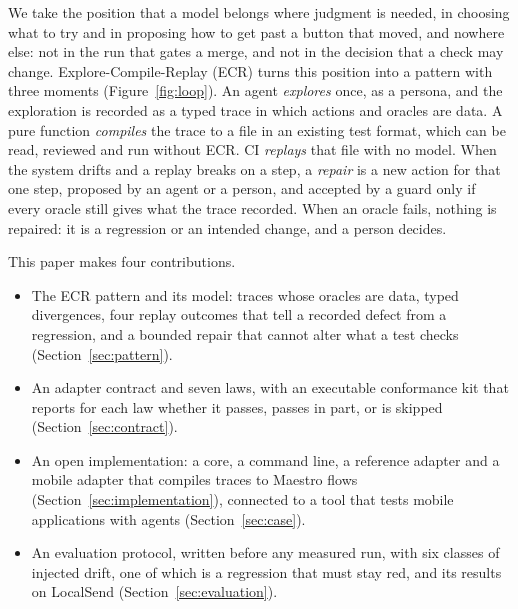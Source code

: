 We take the position that a model belongs where judgment is needed, in choosing what to try and in proposing how to get past a button that moved, and nowhere else: not in the run that gates a merge, and not in the decision that a check may change. Explore-Compile-Replay (ECR) turns this position into a pattern with three moments (Figure~\ref{fig:loop}). An agent \emph{explores} once, as a persona, and the exploration is recorded as a typed trace in which actions and oracles are data. A pure function \emph{compiles} the trace to a file in an existing test format, which can be read, reviewed and run without ECR. CI \emph{replays} that file with no model. When the system drifts and a replay breaks on a step, a \emph{repair} is a new action for that one step, proposed by an agent or a person, and accepted by a guard only if every oracle still gives what the trace recorded. When an oracle fails, nothing is repaired: it is a regression or an intended change, and a person decides.

This paper makes four contributions.
\begin{itemize}
  \item The ECR pattern and its model: traces whose oracles are data, typed divergences, four replay outcomes that tell a recorded defect from a regression, and a bounded repair that cannot alter what a test checks (Section~\ref{sec:pattern}).
  \item An adapter contract and seven laws, with an executable conformance kit that reports for each law whether it passes, passes in part, or is skipped (Section~\ref{sec:contract}).
  \item An open implementation: a core, a command line, a reference adapter and a mobile adapter that compiles traces to Maestro flows (Section~\ref{sec:implementation}), connected to a tool that tests mobile applications with agents (Section~\ref{sec:case}).
  \item An evaluation protocol, written before any measured run, with six classes of injected drift, one of which is a regression that must stay red, and its results on LocalSend (Section~\ref{sec:evaluation}).
\end{itemize}
